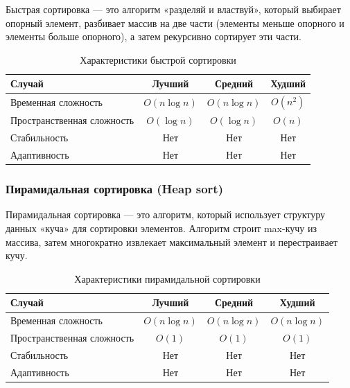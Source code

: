\documentclass[a4paper,12pt]{article}
\begin{document}
Быстрая сортировка --- это алгоритм «разделяй и властвуй», который выбирает опорный элемент, разбивает массив на две части (элементы меньше опорного и элементы больше опорного), а затем рекурсивно сортирует эти части.

\begin{table}[H]
    \centering
    \begin{tabular}{|l|c|c|c|}
        \hline
        Случай & Лучший & Средний & Худший \\
        \hline
        Временная сложность & $O(n \log n)$ & $O(n \log n)$ & $O(n^2)$ \\
        \hline
        Пространственная сложность & $O(\log n)$ & $O(\log n)$ & $O(n)$ \\
        \hline
        Стабильность & Нет & Нет & Нет \\
        \hline
        Адаптивность & Нет & Нет & Нет \\
        \hline
    \end{tabular}
    \caption{Характеристики быстрой сортировки}
\end{table}

\subsubsection{Пирамидальная сортировка (Heap sort)}
\label{subsubsec:пирамидальная-сортировка-heap-sort}

Пирамидальная сортировка --- это алгоритм, который использует структуру данных «куча» для сортировки элементов. Алгоритм строит max-кучу из массива, затем многократно извлекает максимальный элемент и перестраивает кучу.

\begin{table}[H]
    \centering
    \begin{tabular}{|l|c|c|c|}
        \hline
        Случай & Лучший & Средний & Худший \\
        \hline
        Временная сложность & $O(n \log n)$ & $O(n \log n)$ & $O(n \log n)$ \\
        \hline
        Пространственная сложность & $O(1)$ & $O(1)$ & $O(1)$ \\
        \hline
        Стабильность & Нет & Нет & Нет \\
        \hline
        Адаптивность & Нет & Нет & Нет \\
        \hline
    \end{tabular}
    \caption{Характеристики пирамидальной сортировки}
\end{table}
\end{document}
